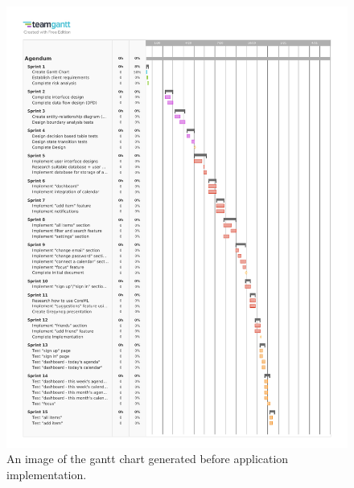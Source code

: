 \begin{figure}[H]

	\centering
	\includegraphics[width=12cm]{./graphics/gantt.pdf}
	\caption{An image of the gantt chart generated before application implementation.}
	\label{fig:gantt}
	
\end{figure}